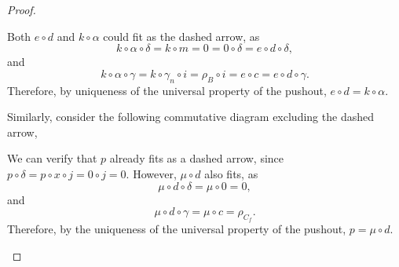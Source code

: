 \begin{proof}
\begin{enumerate}[label={(\bfseries TR\arabic*)}]
{\begin{center}
            \end{center}

            Both \( e \circ d \) and \( k \circ \alpha \) could fit as the dashed arrow, as
            \[
                k \circ \alpha \circ \delta = k \circ m = 0 = 0 \circ \delta = e \circ d \circ \delta,
            \]
            and
            \[
                k \circ \alpha \circ \gamma = k \circ \gamma_n \circ i = \rho_B \circ i = e \circ c = e \circ d \circ \gamma.
            \]
            Therefore, by uniqueness of the universal property of the pushout, \( e \circ d = k \circ \alpha \).

            Similarly, consider the following commutative diagram excluding the dashed arrow,
            \begin{center}
            \end{center}

            We can verify that \( p \) already fits as a dashed arrow, since \( p \circ \delta = p \circ x \circ j = 0 \circ j = 0 \). However, \( \mu \circ d \) also fits, as
            \[
                \mu \circ d \circ \delta = \mu \circ 0 = 0,
            \]
            and
            \[
               \mu \circ d \circ \gamma = \mu \circ c = \rho_{C_f}.
            \]
            Therefore, by the uniqueness of the universal property of the pushout, \( p = \mu \circ d \).

}
\end{enumerate}
\end{proof}
